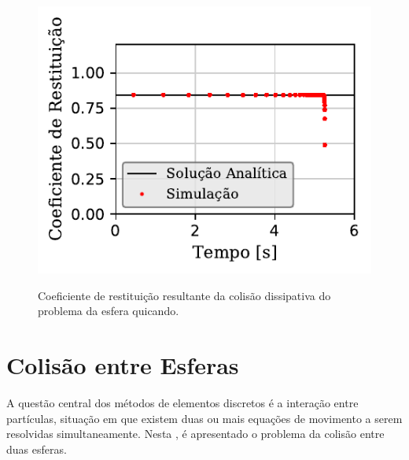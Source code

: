 \begin{figure}[H]
{\begin{subfigure}[t]{\smallresultsfigwidth}
			\caption{}
			\label{subfig:bouncing_sphere:mechanical_energy}
		\end{subfigure}
	}
	\sourceMe
	\label{fig:bouncing_sphere_energy}
\end{figure}

\begin{figure}[H]
	\caption{Coeficiente de restituição resultante da colisão dissipativa do problema da esfera quicando.}
	\centering
		\includegraphics[scale=1]{images/bouncing_sphere/dissipative/small_coefficient_of_restitution.pdf}
	\label{fig:bouncing_sphere:dissipative:coefficient_of_restitution}
	\sourceMe
\end{figure}

\section{Colisão entre Esferas} \label{sec:results:colliding_spheres}

A questão central dos métodos de elementos discretos é a interação entre partículas, situação em que existem duas ou mais equações de movimento a serem resolvidas simultaneamente. Nesta , é apresentado o problema da colisão entre duas esferas.

